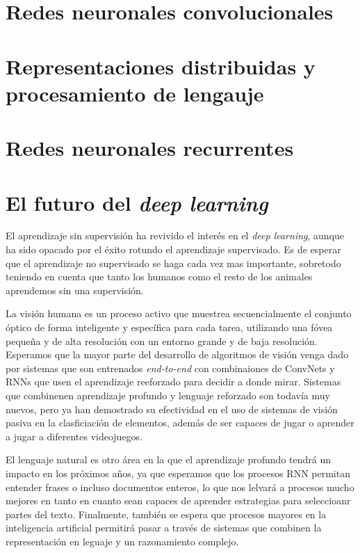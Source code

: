 \section{Redes neuronales convolucionales}

\section{Representaciones distribuidas y procesamiento de lengauje}

\section{Redes neuronales recurrentes}

\section{El futuro del \textit{deep learning}}

El aprendizaje sin supervisión ha revivido el interés en el \textit{deep learning}, aunque ha sido opacado por el éxito rotundo el aprendizaje supervisado. Es de esperar que el aprendizaje no supervisado se haga cada vez mas importante, sobretodo teniendo en cuenta que tanto los humanos como el resto de los animales aprendemos sin una supervisión. 

La visión humana es un proceso activo que muestrea secuencialmente el conjunto óptico de forma inteligente y específica para cada tarea, utilizando una fóvea pequeña y de alta resolución con un entorno grande y de baja resolución. Esperamos que la mayor parte del desarrollo de algoritmos de visión venga dado por sistemas que son entrenados \textit{end-to-end} con combinaiones de ConvNets y RNNs  que usen el aprendizaje reeforzado para decidir a donde mirar. Sistemas que combinenen aprendizaje profundo y lenguaje reforzado son todavía muy nuevos, pero ya han demostrado su efectividad en el uso de sistemas de visión pasiva en la clasficiación de elementos, además de ser capaces de jugar o aprender a jugar a diferentes videojuegos.

El lenguaje natural es otro área en la que el aprendizaje profundo tendrá un impacto en los próximos años, ya que esperamos que los procesos RNN permitan entender frases o incluso documentos enteros, lo que nos lelvará a procesos mucho mejores en tanto en cuanto sean capaces de aprender estrategias para seleccioanr partes del texto. Finalmente, también se espera que procesos mayores en la inteligencia artificial permitirá pasar a través de sistemas que combinen la representación en leguaje y un razonamiento complejo.